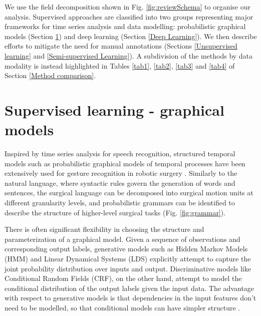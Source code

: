 \documentclass[journal]{IEEEtran}
\begin{document}
We use the field decomposition shown in Fig. \ref{fig:reviewSchema} to organise our analysis. Supervised approaches are classified into two groups representing major frameworks for time series analysis and data modelling: probabilistic graphical models (Section \ref{Probabilistic graphical models}) and deep learning (Section \ref{Deep Learning}). We then describe efforts to mitigate the need for manual annotations (Sections \ref{Unsupervised learning} and \ref{Semi-supervised Learning}). 
A subdivision of the methods by data modality is instead highlighted in Tables \ref{tab1}, \ref{tab2}, \ref{tab3} and \ref{tab4} of Section \ref{Method comparison}.

\section{Supervised learning - graphical models} \label{Probabilistic graphical models}

Inspired by time series analysis for speech recognition, structured temporal models such as probabilistic graphical models of temporal processes have been extensively used for gesture recognition in robotic surgery \cite{Ahmidi2017}. Similarly to the natural language, where syntactic rules govern the generation of words and sentences, the surgical language can be decomposed into surgical motion units at different granularity levels, and probabilistic grammars can be identified to describe the structure of higher-level surgical tasks (Fig. \ref{fig:grammar}).

There is often significant flexibility in choosing the structure and parameterization of a graphical model. Given a sequence of observations and corresponding output labels, generative models such as Hidden Markov Models (HMM) and Linear Dynamical Systems (LDS) explicitly attempt to capture the joint probability distribution over inputs and output. Discriminative models like Conditional Random Fields (CRF), on the other hand, attempt to model the conditional distribution of the output labels given the input data. The advantage with respect to generative models is that dependencies in the input features don’t need to be modelled, so that conditional models can have simpler structure \cite{Sutton2011}.
\end{document}
